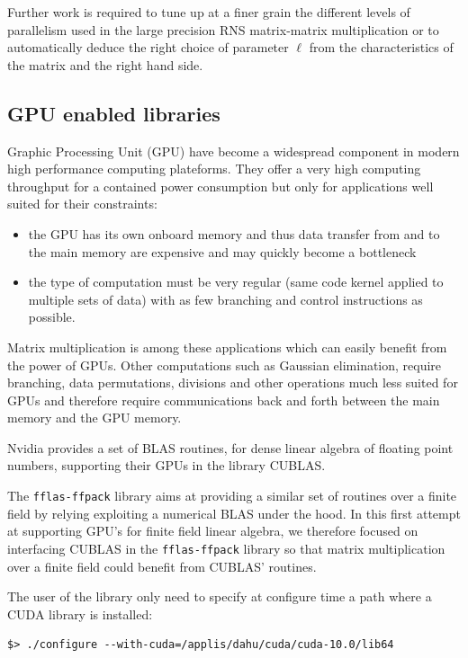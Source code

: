 Further work is required to tune up at a finer grain the different
levels of parallelism used in the large precision RNS matrix-matrix
multiplication or to automatically deduce the right choice of
parameter $\ell$ from the characteristics of the matrix and the right
hand side.

\subsection{GPU enabled libraries}

Graphic Processing Unit (GPU) have become a widespread component in modern high performance computing plateforms. They
offer a very high computing throughput for a contained power consumption but only for applications well suited for their
constraints:
\begin{itemize}
\item the GPU has its own onboard memory and thus data transfer from and to the main memory are expensive and may
  quickly become a bottleneck
\item the type of computation must be very regular (same code kernel applied to multiple sets of data) with as few
  branching and control instructions as possible.
\end{itemize}

Matrix multiplication is among these applications which can easily benefit from the power of GPUs. Other computations
such as Gaussian elimination, require branching, data permutations, divisions and other operations much less suited for
GPUs and therefore require communications back and forth between the main memory and the GPU memory.

Nvidia provides a set of BLAS routines, for dense linear algebra of floating point numbers, supporting their GPUs in the
library CUBLAS.

The \texttt{fflas-ffpack} library aims at providing a similar set of routines over a finite field by relying exploiting a
numerical BLAS under the hood. In this first attempt at supporting GPU's for finite field linear algebra, we therefore
focused on interfacing CUBLAS in the \texttt{fflas-ffpack} library so that matrix multiplication over a finite field
could benefit from CUBLAS' routines.

The user of the library only need to specify at configure time a path where a CUDA library is installed:
\begin{verbatim}
$> ./configure --with-cuda=/applis/dahu/cuda/cuda-10.0/lib64
\end{verbatim}

